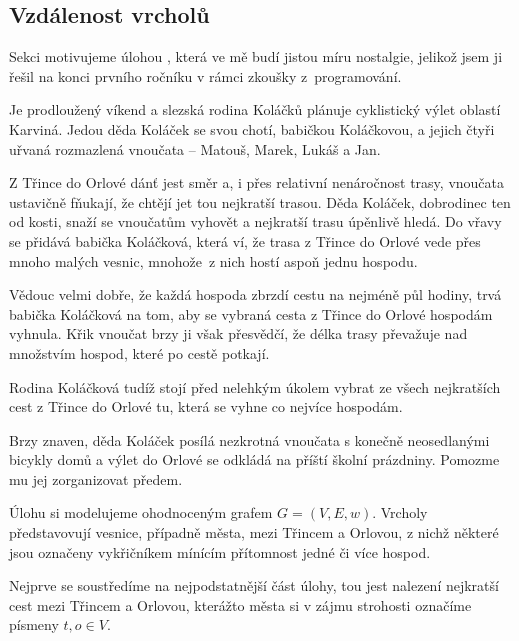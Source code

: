 \subsection{Vzdálenost vrcholů}
\label{ssec:vzdalenost-vrcholu}

Sekci motivujeme úlohou , která ve mě budí jistou míru
nostalgie, jelikož jsem ji řešil na konci prvního ročníku v rámci zkoušky
z~programování.

\begin{problem}
 \label{prob:rodinny-vylet}
 Je prodloužený víkend a slezská rodina Koláčků plánuje cyklistický výlet
 oblastí Karviná. Jedou děda Koláček se svou chotí, babičkou Koláčkovou, a
 jejich čtyři uřvaná rozmazlená vnoučata -- Matouš, Marek, Lukáš a Jan.

 Z Třince do Orlové dánť jest směr a, i přes relativní nenáročnost trasy,
 vnoučata ustavičně fňukají, že chtějí jet tou nejkratší trasou. Děda Koláček,
 dobrodinec ten od kosti, snaží se vnoučatům vyhovět a nejkratší trasu úpěnlivě
 hledá. Do vřavy se přidává babička Koláčková, která ví, že trasa z Třince do
 Orlové vede přes mnoho malých vesnic, mnohože~z nich hostí aspoň jednu hospodu.

 Vědouc velmi dobře, že každá hospoda zbrzdí cestu na nejméně půl hodiny, trvá
 babička Koláčková na tom, aby se vybraná cesta z Třince do Orlové hospodám
 vyhnula. Křik vnoučat brzy ji však přesvědčí, že délka trasy převažuje nad
 množstvím hospod, které po cestě potkají.

 Rodina Koláčková tudíž stojí před nelehkým úkolem vybrat ze všech nejkratších
 cest z Třince do Orlové tu, která se vyhne co nejvíce hospodám.

 Brzy znaven, děda Koláček posílá nezkrotná vnoučata s konečně neosedlanými
 bicykly domů a výlet do Orlové se odkládá na příští školní prázdniny. Pomozme
 mu jej zorganizovat předem.
\end{problem}

Úlohu si modelujeme ohodnoceným grafem $G = (V,E,w)$. Vrcholy představovují
vesnice, případně města, mezi Třincem a Orlovou, z nichž některé jsou označeny
vykřičníkem mínícím přítomnost jedné či více hospod.

Nejprve se soustředíme na nejpodstatnější část úlohy, tou jest nalezení
nejkratší cest mezi Třincem a Orlovou, kterážto města si v zájmu strohosti
označíme písmeny $t,o \in V$.
